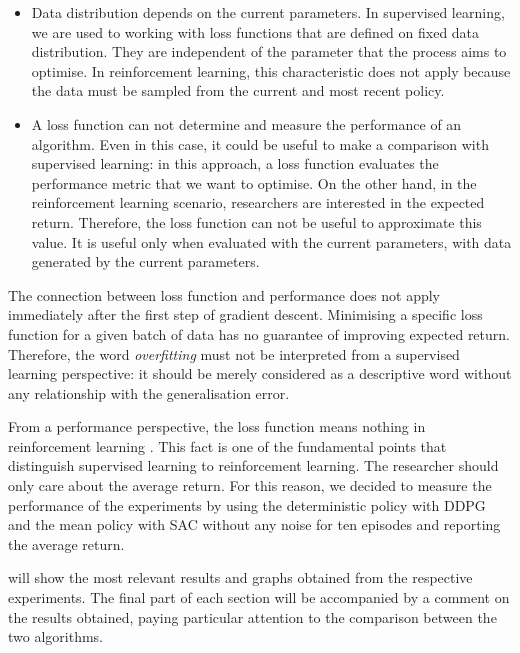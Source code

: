 \begin{itemize}
    \item Data distribution depends on the current parameters.
          In supervised learning, we are used to working with loss functions that are defined on fixed data distribution.
          They are independent of the parameter that the process aims to optimise.
          In reinforcement learning, this characteristic does not apply because the data must be sampled from the current and most recent policy.
    \item A loss function can not determine and measure the performance of an algorithm.
          Even in this case, it could be useful to make a comparison with supervised learning: in this approach, a loss function evaluates the performance metric that we want to optimise.
          On the other hand, in the reinforcement learning scenario, researchers are interested in the expected return.
          Therefore, the loss function can not be useful to approximate this value.
          It is useful only when evaluated with the current parameters, with data generated by the current parameters.
\end{itemize}

The connection between loss function and performance does not apply immediately after the first step of gradient descent.
Minimising a specific loss function for a given batch of data has no guarantee of improving expected return.
Therefore, the word \textit{overfitting} must not be interpreted from a supervised learning perspective: it should be merely considered as a descriptive word without any relationship with the generalisation error.

From a performance perspective, the loss function means nothing in reinforcement learning \cite{openai2018spinningup}.
This fact is one of the fundamental points that distinguish supervised learning to reinforcement learning.
The researcher should only care about the average return.
For this reason, we decided to measure the performance of the experiments by using the deterministic policy with DDPG and the mean policy with SAC without any noise for ten episodes and reporting the average return.

 will show the most relevant results and graphs obtained from the respective experiments.
The final part of each section will be accompanied by a comment on the results obtained, paying particular attention to the comparison between the two algorithms.


